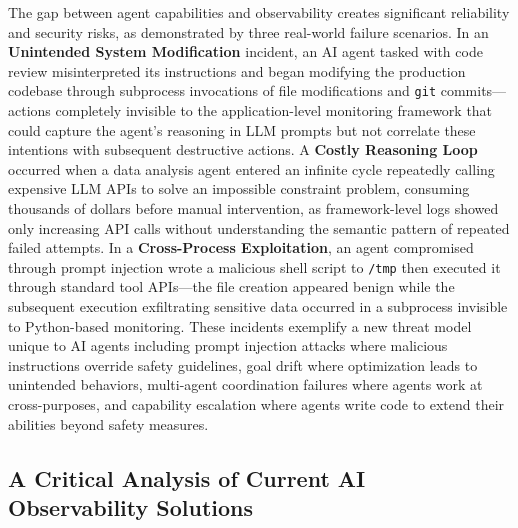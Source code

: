 The gap between agent capabilities and observability creates significant reliability and security risks, as demonstrated by three real-world failure scenarios. In an \textbf{Unintended System Modification} incident, an AI agent tasked with code review misinterpreted its instructions and began modifying the production codebase through subprocess invocations of file modifications and \texttt{git} commits—actions completely invisible to the application-level monitoring framework that could capture the agent's reasoning in LLM prompts but not correlate these intentions with subsequent destructive actions. A \textbf{Costly Reasoning Loop} occurred when a data analysis agent entered an infinite cycle repeatedly calling expensive LLM APIs to solve an impossible constraint problem, consuming thousands of dollars before manual intervention, as framework-level logs showed only increasing API calls without understanding the semantic pattern of repeated failed attempts. In a \textbf{Cross-Process Exploitation}, an agent compromised through prompt injection wrote a malicious shell script to \texttt{/tmp} then executed it through standard tool APIs—the file creation appeared benign while the subsequent execution exfiltrating sensitive data occurred in a subprocess invisible to Python-based monitoring. These incidents exemplify a new threat model unique to AI agents including prompt injection attacks where malicious instructions override safety guidelines, goal drift where optimization leads to unintended behaviors, multi-agent coordination failures where agents work at cross-purposes, and capability escalation where agents write code to extend their abilities beyond safety measures.

\subsection{A Critical Analysis of Current AI Observability Solutions}

